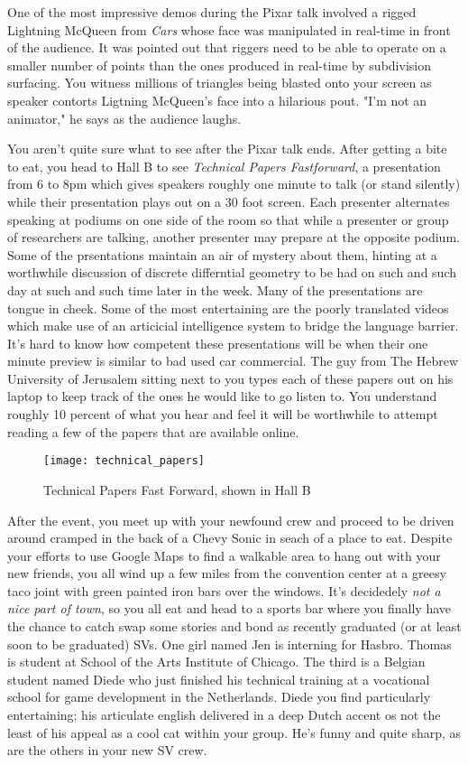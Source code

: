 \documentclass[../main.tex]{subfiles}
\begin{document}
One of the most impressive demos during the Pixar talk involved a rigged Lightning McQueen from \textit{Cars} whose face was manipulated in real-time in front of the audience. It was pointed out that riggers need to be able to operate on a smaller number of points than the ones produced in real-time by subdivision surfacing. You witness millions of triangles being blasted onto your screen as speaker  contorts Ligtning McQueen's face into a hilarious pout. "I'm not an animator," he says as the audience laughs.

You aren't quite sure what to see after the Pixar talk ends. After getting a bite to eat, you head to Hall B to see \textit{Technical Papers Fastforward}, a presentation from 6 to 8pm which gives speakers roughly one minute to talk (or stand silently) while their presentation plays out on a 30 foot screen. Each presenter alternates speaking at podiums on one side of the room so that while a presenter or group of researchers are talking, another presenter may prepare at the opposite podium. Some of the prsentations maintain an air of mystery about them, hinting at a worthwhile discussion of discrete differntial geometry to be had on such and such day at such and such time later in the week. Many of the presentations are tongue in cheek. Some of the most entertaining are the poorly translated videos which make use of an articicial intelligence system to bridge the language barrier. It's hard to know how competent these presentations will be when their one minute preview is similar to bad used car commercial. The guy from The Hebrew University of Jerusalem sitting next to you types each of these papers out on his laptop to keep track of the ones he would like to go listen to. You understand roughly 10 percent of what you hear and feel it will be worthwhile to attempt reading a few of the papers that are available online.

\begin{figure}[h!]
	\centering
	\texttt{[image: technical\_papers]}
	\caption*{Technical Papers Fast Forward, shown in Hall B}
\end{figure}

After the event, you meet up with your newfound crew and proceed to be driven around cramped in the back of a Chevy Sonic in seach of a place to eat. Despite your efforts to use Google Maps to find a walkable area to hang out with your new friends, you all wind up a few miles from the convention center at a greesy taco joint with green painted iron bars over the windows. It's decidedely \textit{not a nice part of town}, so you all eat and head to a sports bar where you finally have the chance to catch swap some stories and bond as recently graduated (or at least soon to be graduated) SVs. One girl named Jen is interning for Hasbro. Thomas is student at School of the Arts Institute of Chicago. The third is a Belgian student named Diede who just finished his technical training at a vocational school for game development in the Netherlands. Diede you find particularly entertaining; his articulate english delivered in a deep Dutch accent os not the least of his appeal as a cool cat within your group. He's funny and quite sharp, as are the others in your new SV crew. 
\end{document}
